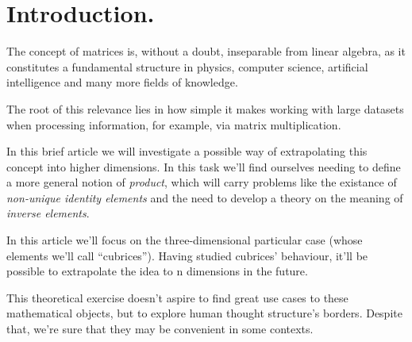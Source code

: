 \section{Introduction.} \label{intro}

The concept of matrices is, without a doubt, inseparable from linear algebra, as it constitutes a fundamental structure in physics, computer science, artificial intelligence and many more fields of knowledge.

The root of this relevance lies in how simple it makes working with large datasets when processing information, for example, via matrix multiplication.

In this brief article we will investigate a possible way of extrapolating this concept into higher dimensions. In this task we'll find ourselves needing to define a more general notion of \textit{product}, which will carry problems like the existance of \textit{non-unique identity elements} and the need to develop a theory on the meaning of \textit{inverse elements}.

In this article we'll focus on the three-dimensional particular case (whose elements we'll call ``cubrices''). Having studied cubrices' behaviour, it'll be possible to extrapolate the idea to n dimensions in the future.

This theoretical exercise doesn't aspire to find great use cases to these mathematical objects, but to explore human thought structure's borders. Despite that, we're sure that they may be convenient in some contexts.
